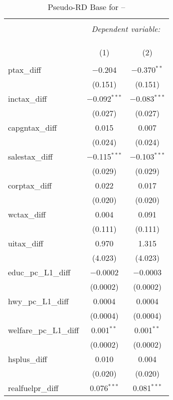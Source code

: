 
\begin{table}[!htbp] \centering 
  \caption{Pseudo-RD Base for  --} 
  \label{} 
\begin{tabular}{@{\extracolsep{5pt}}lcc} 
\\[-1.8ex]\hline 
\hline \\[-1.8ex] 
 & \multicolumn{2}{c}{\textit{Dependent variable:}} \\ 
\cline{2-3} 
\\[-1.8ex] & \multicolumn{2}{c}{ } \\ 
\\[-1.8ex] & (1) & (2)\\ 
\hline \\[-1.8ex] 
 ptax\_diff & $-$0.204 & $-$0.370$^{**}$ \\ 
  & (0.151) & (0.151) \\ 
  inctax\_diff & $-$0.092$^{***}$ & $-$0.083$^{***}$ \\ 
  & (0.027) & (0.027) \\ 
  capgntax\_diff & 0.015 & 0.007 \\ 
  & (0.024) & (0.024) \\ 
  salestax\_diff & $-$0.115$^{***}$ & $-$0.103$^{***}$ \\ 
  & (0.029) & (0.029) \\ 
  corptax\_diff & 0.022 & 0.017 \\ 
  & (0.020) & (0.020) \\ 
  wctax\_diff & 0.004 & 0.091 \\ 
  & (0.111) & (0.111) \\ 
  uitax\_diff & 0.970 & 1.315 \\ 
  & (4.023) & (4.023) \\ 
  educ\_pc\_L1\_diff & $-$0.0002 & $-$0.0003 \\ 
  & (0.0002) & (0.0002) \\ 
  hwy\_pc\_L1\_diff & 0.0004 & 0.0004 \\ 
  & (0.0004) & (0.0004) \\ 
  welfare\_pc\_L1\_diff & 0.001$^{**}$ & 0.001$^{**}$ \\ 
  & (0.0002) & (0.0002) \\ 
  hsplus\_diff & 0.010 & 0.004 \\ 
  & (0.020) & (0.020) \\ 
  realfuelpr\_diff & 0.076$^{***}$ & 0.081$^{***}$ \\ 

\end{tabular}
\end{table}
